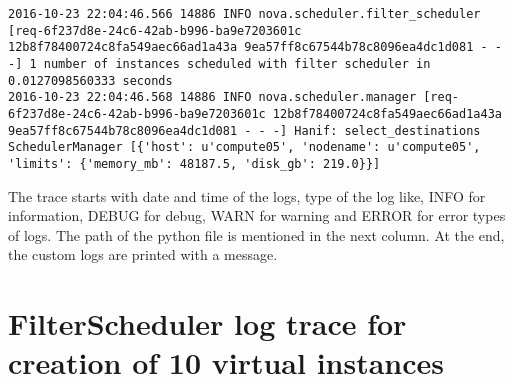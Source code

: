 \begin{lstlisting}[frame=single, caption={The filter scheduler code trace log}, label={lst:filterschedulercodetracelog}]
2016-10-23 22:04:46.566 14886 INFO nova.scheduler.filter_scheduler [req-6f237d8e-24c6-42ab-b996-ba9e7203601c 12b8f78400724c8fa549aec66ad1a43a 9ea57ff8c67544b78c8096ea4dc1d081 - - -] 1 number of instances scheduled with filter scheduler in 0.0127098560333 seconds
2016-10-23 22:04:46.568 14886 INFO nova.scheduler.manager [req-6f237d8e-24c6-42ab-b996-ba9e7203601c 12b8f78400724c8fa549aec66ad1a43a 9ea57ff8c67544b78c8096ea4dc1d081 - - -] Hanif: select_destinations SchedulerManager [{'host': u'compute05', 'nodename': u'compute05', 'limits': {'memory_mb': 48187.5, 'disk_gb': 219.0}}]
\end{lstlisting}

The trace starts with date and time of the logs, type of the log like, INFO for information, DEBUG for debug, WARN for warning and ERROR for error types of logs.
The path of the python file is mentioned in the next column. At the end, the custom logs are printed with a message.

\section{FilterScheduler log trace for creation of 10 virtual instances}\label{app:sec:filterschedulerlogtrace10vi}

